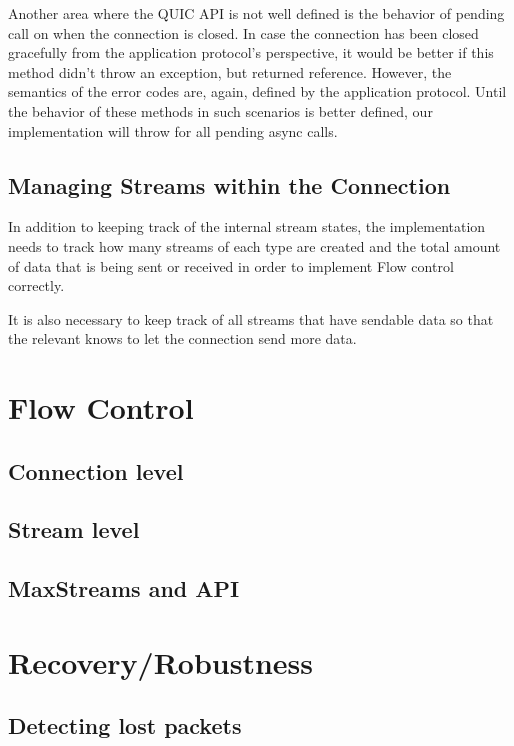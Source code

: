 Another area where the QUIC API is not well defined is the behavior of pending 
call on \QuicConnection{} when the connection is closed. In case the connection has been closed
gracefully from the application protocol's perspective, it would be better if this method didn't
throw an exception, but returned  reference. However, the semantics of the error codes
are, again, defined by the application protocol. Until the behavior of these methods in such
scenarios is better defined, our implementation will throw
 for all pending async calls.

\subsection{Managing Streams within the Connection}

In addition to keeping track of the internal stream states, the \QuicConnection{} implementation
needs to track how many streams of each type are created and the total amount of data that is being
sent or received in order to implement Flow control correctly.

It is also necessary to keep track of all streams that have sendable data so that the relevant
\QuicSocketContext{} knows to let the connection send more data.

\section{Flow Control}

\subsection{Connection level}
\subsection{Stream level}
\subsection{MaxStreams and API}

\section{Recovery/Robustness}

\subsection{Detecting lost packets}

